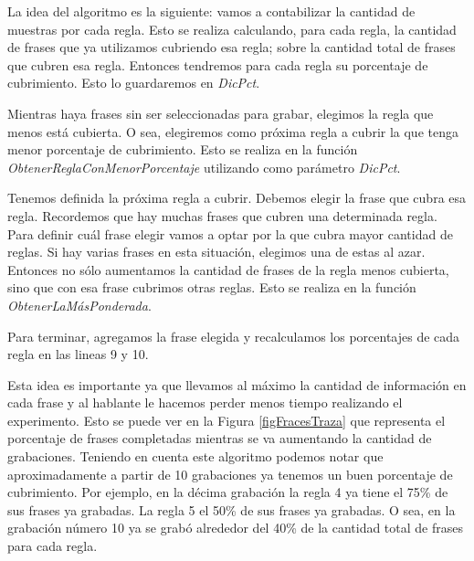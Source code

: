 
La idea del algoritmo es la siguiente: vamos a contabilizar la cantidad de muestras por cada regla. Esto se realiza calculando, para cada regla, la cantidad de frases que ya utilizamos cubriendo esa regla; sobre la cantidad total de frases que cubren esa regla. Entonces tendremos para cada regla su porcentaje de cubrimiento. Esto lo guardaremos en \textit{DicPct}.

Mientras haya frases sin ser seleccionadas para grabar, elegimos la regla que menos está cubierta. O sea, elegiremos como próxima regla a cubrir la que tenga menor porcentaje de cubrimiento. Esto se realiza en la función \textit{ObtenerReglaConMenorPorcentaje} utilizando como parámetro \textit{DicPct}.

Tenemos definida la próxima regla a cubrir. Debemos elegir la frase que cubra esa regla. Recordemos que hay muchas frases que cubren una determinada regla. Para definir cuál frase elegir vamos a optar por la que cubra mayor cantidad de reglas. Si hay varias frases en esta situación, elegimos una de estas al azar. Entonces no sólo aumentamos la cantidad de frases de la regla menos cubierta, sino que con esa frase cubrimos otras reglas. Esto se realiza en la función \textit{ObtenerLaMásPonderada}.

Para terminar, agregamos la frase elegida y recalculamos los porcentajes de cada regla en las lineas 9 y 10.

Esta idea es importante ya que llevamos al máximo la cantidad de información en cada frase y al hablante le hacemos perder menos tiempo realizando el experimento. Esto se puede ver en la Figura \ref{figFracesTraza} que representa el porcentaje de frases completadas mientras se va aumentando la cantidad de grabaciones. Teniendo en cuenta este algoritmo podemos notar que aproximadamente a partir de 10 grabaciones ya tenemos un buen porcentaje de cubrimiento. Por ejemplo, en la décima grabación la regla 4 ya tiene el 75\% de sus frases ya grabadas. La regla 5 el 50\% de sus frases ya grabadas. O sea, en la grabación número 10 ya se grabó alrededor del 40\% de la cantidad total de frases para cada regla.

